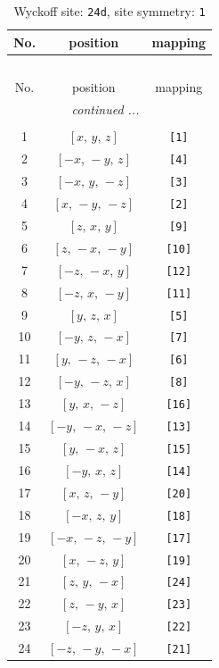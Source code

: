 \documentclass[fleqn,8pt]{jsarticle}
\begin{document}
\begin{longtable}{ccc}
\caption{Wyckoff site: {\tt 24d}, site symmetry: {\tt 1}}
 \\
 \hline \hline
No. & position & mapping \\ \hline \endfirsthead

\multicolumn{2}{l}{\tablename\ \thetable{}} \\
 \hline \hline
No. & position & mapping \\ \hline \endhead

 \hline \hline
\multicolumn{2}{r}{\footnotesize\it continued ...} \\ \endfoot

 \hline \hline
\multicolumn{2}{r}{} \\ \endlastfoot

1 & $\left[ x,\, y,\, z \right]$ & {\tt [1]} \\ \hline
2 & $\left[ - x,\, - y,\, z \right]$ & {\tt [4]} \\ \hline
3 & $\left[ - x,\, y,\, - z \right]$ & {\tt [3]} \\ \hline
4 & $\left[ x,\, - y,\, - z \right]$ & {\tt [2]} \\ \hline
5 & $\left[ z,\, x,\, y \right]$ & {\tt [9]} \\ \hline
6 & $\left[ z,\, - x,\, - y \right]$ & {\tt [10]} \\ \hline
7 & $\left[ - z,\, - x,\, y \right]$ & {\tt [12]} \\ \hline
8 & $\left[ - z,\, x,\, - y \right]$ & {\tt [11]} \\ \hline
9 & $\left[ y,\, z,\, x \right]$ & {\tt [5]} \\ \hline
10 & $\left[ - y,\, z,\, - x \right]$ & {\tt [7]} \\ \hline
11 & $\left[ y,\, - z,\, - x \right]$ & {\tt [6]} \\ \hline
12 & $\left[ - y,\, - z,\, x \right]$ & {\tt [8]} \\ \hline
13 & $\left[ y,\, x,\, - z \right]$ & {\tt [16]} \\ \hline
14 & $\left[ - y,\, - x,\, - z \right]$ & {\tt [13]} \\ \hline
15 & $\left[ y,\, - x,\, z \right]$ & {\tt [15]} \\ \hline
16 & $\left[ - y,\, x,\, z \right]$ & {\tt [14]} \\ \hline
17 & $\left[ x,\, z,\, - y \right]$ & {\tt [20]} \\ \hline
18 & $\left[ - x,\, z,\, y \right]$ & {\tt [18]} \\ \hline
19 & $\left[ - x,\, - z,\, - y \right]$ & {\tt [17]} \\ \hline
20 & $\left[ x,\, - z,\, y \right]$ & {\tt [19]} \\ \hline
21 & $\left[ z,\, y,\, - x \right]$ & {\tt [24]} \\ \hline
22 & $\left[ z,\, - y,\, x \right]$ & {\tt [23]} \\ \hline
23 & $\left[ - z,\, y,\, x \right]$ & {\tt [22]} \\ \hline
24 & $\left[ - z,\, - y,\, - x \right]$ & {\tt [21]} \\
\end{longtable}
\end{document}

